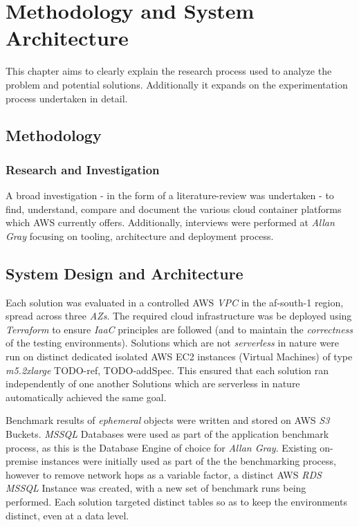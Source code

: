 \part{Methodology and System Architecture}

This chapter aims to clearly explain the research process used to analyze the problem and potential solutions.
Additionally it expands on the experimentation process undertaken in detail.

\chapter{Methodology}

\section{Research and Investigation}

A broad investigation - in the form of a literature-review was undertaken - to find, understand, compare and document the various cloud container platforms which AWS currently offers.
Additionally, interviews were performed at \emph{Allan Gray} focusing on tooling, architecture and deployment process.

\chapter{System Design and Architecture}

Each solution was evaluated in a controlled AWS \emph{VPC} in the af-south-1 region, spread across three \emph{AZs}.
The required cloud infrastructure was be deployed using \emph{Terraform} to ensure \emph{IaaC} principles are followed (and to maintain the \emph{correctness} of the testing environments).
Solutions which are not \emph{serverless} in nature were run on distinct dedicated isolated AWS EC2 instances (Virtual Machines) of type \emph{m5.2xlarge} TODO-ref, TODO-addSpec. This ensured that each solution ran independently of one another
Solutions which are serverless in nature automatically achieved the same goal.

Benchmark results of \emph{ephemeral} objects were written and stored on AWS \emph{S3} Buckets.
\emph{MSSQL} Databases were used as part of the application benchmark process, as this is the Database Engine of choice for \emph{Allan Gray}.
Existing on-premise instances were initially used as part of the the benchmarking process, however to remove network hops as a variable factor,
a distinct AWS \emph{RDS} \emph{MSSQL} Instance was created, with a new set of benchmark runs being performed.
Each solution targeted distinct tables so as to keep the environments distinct, even at a data level.

